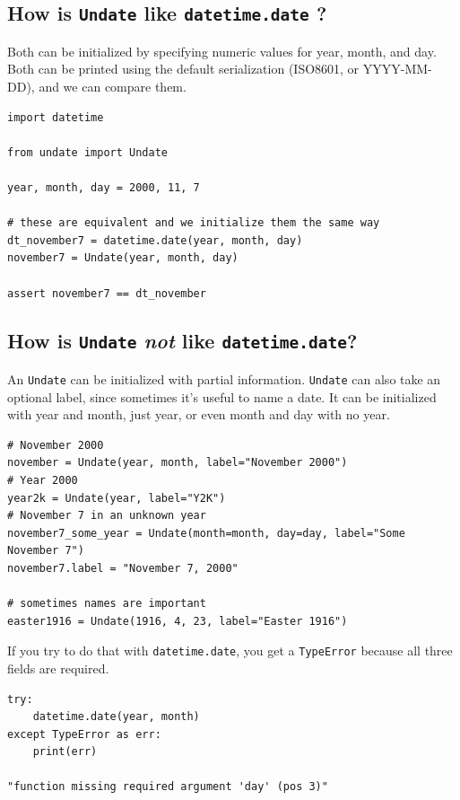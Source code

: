 \documentclass{anthology-ch}         %
\begin{document}
\subsection{How is \texttt{Undate} like \texttt{datetime.date} ?} \label{sec:intro_details}


Both can be initialized by specifying numeric values for year, month, and day. Both can be printed using the default serialization (ISO8601, or YYYY-MM-DD), and we can compare them.

\begin{verbatim}
import datetime

from undate import Undate

year, month, day = 2000, 11, 7

# these are equivalent and we initialize them the same way
dt_november7 = datetime.date(year, month, day)
november7 = Undate(year, month, day)

assert november7 == dt_november
\end{verbatim}


\subsection{How is \texttt{Undate} \textit{not} like \texttt{datetime.date}?}

An \texttt{Undate} can be initialized with partial information.  \texttt{Undate} can also take an optional label, since sometimes it's useful to name a date.  It can be initialized with year and month, just year, or even month and day with no year.

\begin{verbatim}
# November 2000
november = Undate(year, month, label="November 2000")
# Year 2000
year2k = Undate(year, label="Y2K")
# November 7 in an unknown year
november7_some_year = Undate(month=month, day=day, label="Some November 7")
november7.label = "November 7, 2000"

# sometimes names are important
easter1916 = Undate(1916, 4, 23, label="Easter 1916")
\end{verbatim}


If you try to do that with \texttt{datetime.date}, you get a
\texttt{TypeError} because all three fields are required.

\begin{verbatim}
try:
    datetime.date(year, month)
except TypeError as err:
    print(err)

"function missing required argument 'day' (pos 3)"
\end{verbatim}
\end{document}
